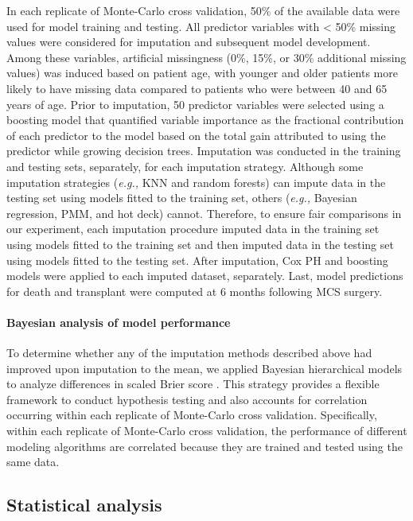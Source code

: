 \documentclass{article}
\begin{document}
In each replicate of Monte-Carlo cross validation, 50\% of the available
data were used for model training and testing. All predictor variables
with \textless{} 50\% missing values were considered for imputation and
subsequent model development. Among these variables, artificial
missingness (0\%, 15\%, or 30\% additional missing values) was induced
based on patient age, with younger and older patients more likely to
have missing data compared to patients who were between 40 and 65 years
of age. Prior to imputation, 50 predictor variables were selected using
a boosting model that quantified variable importance as the fractional
contribution of each predictor to the model based on the total gain
attributed to using the predictor while growing decision trees.
Imputation was conducted in the training and testing sets, separately,
for each imputation strategy. Although some imputation strategies
(\textit{e.g., }KNN and random forests) can impute data in the testing
set using models fitted to the training set, others
(\textit{e.g., }Bayesian regression, PMM, and hot deck) cannot.
Therefore, to ensure fair comparisons in our experiment, each imputation
procedure imputed data in the training set using models fitted to the
training set and then imputed data in the testing set using models
fitted to the testing set. After imputation, Cox PH and boosting models
were applied to each imputed dataset, separately. Last, model
predictions for death and transplant were computed at 6 months following
MCS surgery.

\paragraph{Bayesian analysis of model performance}

To determine whether any of the imputation methods described above had
improved upon imputation to the mean, we applied Bayesian hierarchical
models to analyze differences in scaled Brier score
\cite{benavoli2017time}. This strategy provides a flexible framework to
conduct hypothesis testing and also accounts for correlation occurring
within each replicate of Monte-Carlo cross validation. Specifically,
within each replicate of Monte-Carlo cross validation, the performance
of different modeling algorithms are correlated because they are trained
and tested using the same data.

\hypertarget{statistical-analysis}{%
\subsection{Statistical analysis}\label{statistical-analysis}}
\end{document}
